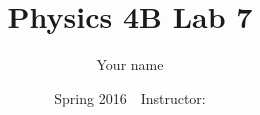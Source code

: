 \documentclass{article}
\begin{document}
\title{Physics 4B Lab 7}
\author{Your name}
\date{Spring 2016$\quad$Instructor: }
\maketitle
\end{document}
